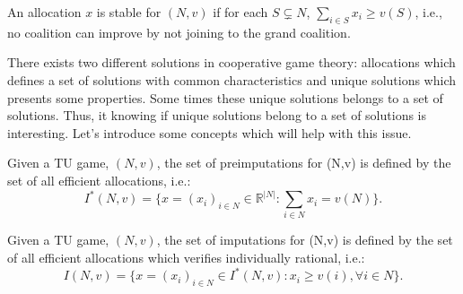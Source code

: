 
\begin{definition}
	An allocation $x$ is stable for $(N,v)$ if for each $S \subsetneq N $, $\sum_{i \in S} x_{i} \geq v(S)$, i.e., no coalition can improve by not joining to the grand coalition. 
\end{definition}



There exists two different solutions in cooperative game theory: allocations which defines a set of solutions with common characteristics and unique solutions which presents some properties. Some times these unique solutions belongs to a set of solutions. Thus, it knowing if unique solutions belong to a set of solutions is interesting. Let's introduce some concepts which will help with this issue. 





\begin{definition}
	Given a TU game, $(N,v)$, the set of preimputations for (N,v) is defined by the set of all efficient allocations, i.e.:
	$$I^{*}(N,v) = \{x= (x_i)_{i \in N} \in \mathbb{R}^{|N|}: \sum_{i \in N}x_i = v(N) \}.$$
	
\end{definition}


\begin{definition}
	Given a TU game, $(N,v)$, the set of imputations for (N,v) is defined by the set of all efficient allocations which verifies individually rational, i.e.:
	$$I(N,v) = \{x= (x_i)_{i \in N} \in I^{*}(N,v) : x_i \geq v({i}),\forall i \in N\}.$$
\end{definition}

